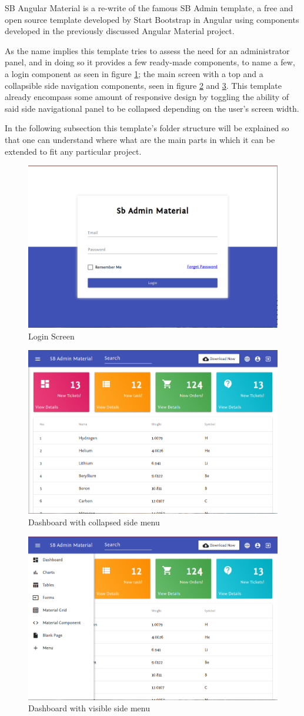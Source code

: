 SB Angular Material is a re-write of the famous SB Admin template\cite{angulartemplate}, a free and open source template developed by Start Bootstrap\cite{sbadmin} in Angular using components developed in the previously discussed Angular Material project.

As the name implies this template tries to assess the need for an administrator panel, and in doing so it provides a few ready-made components, to name a few, a login component as seen in figure \ref{fig:login}; the main screen with a top and a collapsible side navigation components, seen in figure \ref{fig:dash} and \ref{fig:visible}. This template already encompass some amount of responsive design by toggling the ability of said side navigational panel to be collapsed depending on the user's screen width.


In the following subsection this template's folder structure will be explained so that one can understand where what are the main parts in which it can be extended to fit any particular project.

\begin{figure}
  \centering
  \includegraphics[width=.5\textwidth]{images/sbadmin/login}
  \caption{Login Screen}
  \label{fig:login}
\end{figure}
\begin{figure}
  \centering
  \includegraphics[width=.5\textwidth]{images/sbadmin/collapsed}
  \caption{Dashboard with collapsed side menu}
  \label{fig:dash}
\end{figure}
\begin{figure}
  \centering
  \includegraphics[width=.5\textwidth]{images/sbadmin/visible}
  \caption{Dashboard with visible side menu}
  \label{fig:visible}
\end{figure}

